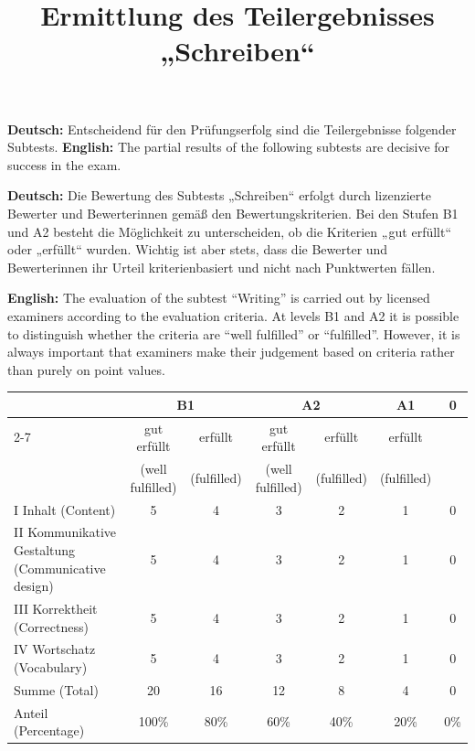 \documentclass[a4paper]{article}
\title{Ermittlung des Teilergebnisses „Schreiben“}
\date{}
\begin{document}
    \maketitle
    
    \textbf{Deutsch:} Entscheidend für den Prüfungserfolg sind die Teilergebnisse folgender Subtests.
    \textbf{English:} The partial results of the following subtests are decisive for success in the exam.
    
    \textbf{Deutsch:} Die Bewertung des Subtests „Schreiben“ erfolgt durch lizenzierte Bewerter und Bewerterinnen gemäß den Bewertungskriterien. Bei den Stufen B1 und A2 besteht die Möglichkeit zu unterscheiden, ob die Kriterien „gut erfüllt“ oder „erfüllt“ wurden. Wichtig ist aber stets, dass die Bewerter und Bewerterinnen ihr Urteil kriterienbasiert und nicht nach Punktwerten fällen.
    
    \textbf{English:} The evaluation of the subtest “Writing” is carried out by licensed examiners according to the evaluation criteria. At levels B1 and A2 it is possible to distinguish whether the criteria are “well fulfilled” or “fulfilled”. However, it is always important that examiners make their judgement based on criteria rather than purely on point values.
    
    \begin{table}[H]
        \centering
        \begin{tabular}{|l|c|c|c|c|c|c|}
            \hline
            & \multicolumn{2}{c|}{B1} & \multicolumn{2}{c|}{A2} & A1 & 0 \\
            \cline{2-7}
            & gut erfüllt      & erfüllt     & gut erfüllt      & erfüllt     & erfüllt     &     \\
            & (well fulfilled) & (fulfilled) & (well fulfilled) & (fulfilled) & (fulfilled) &     \\
            \hline
            I Inhalt (Content)                                 & 5                & 4           & 3                & 2           & 1           & 0   \\
            II Kommunikative Gestaltung (Communicative design) & 5                & 4           & 3                & 2           & 1           & 0   \\
            III Korrektheit (Correctness)                      & 5                & 4           & 3                & 2           & 1           & 0   \\
            IV Wortschatz (Vocabulary)                         & 5                & 4           & 3                & 2           & 1           & 0   \\
            \hline
            Summe (Total)                                      & 20               & 16          & 12               & 8           & 4           & 0   \\
            Anteil (Percentage)                                & 100\%            & 80\%        & 60\%             & 40\%        & 20\%        & 0\% \\
            \hline
        \end{tabular}
    \end{table}
    
\end{document}
